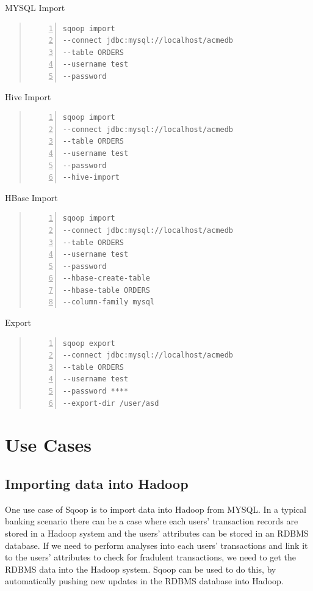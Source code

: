 \documentclass[9pt,twocolumn,twoside]{../../styles/osajnl}
\begin{document}
\begin{algorithm}
\caption{MYSQL Import}\label{alg:mysql}
\begin{quote}
\begin{Verbatim}[numbers=left]
sqoop import 
--connect jdbc:mysql://localhost/acmedb 
--table ORDERS 
--username test 
--password 
\end{Verbatim}
\end{quote}
\end{algorithm}
\begin{algorithm}
\caption{Hive Import}\label{alg:hive}
\begin{quote}
\begin{Verbatim}[numbers=left]
sqoop import 
--connect jdbc:mysql://localhost/acmedb 
--table ORDERS 
--username test 
--password
--hive-import
\end{Verbatim}
\end{quote}
\end{algorithm}
\begin{algorithm}
\caption{HBase Import}\label{alg:hbase}
\begin{quote}
\begin{Verbatim}[numbers=left]
sqoop import 
--connect jdbc:mysql://localhost/acmedb
--table ORDERS 
--username test 
--password 
--hbase-create-table 
--hbase-table ORDERS 
--column-family mysql
\end{Verbatim}
\end{quote}
\end{algorithm}

\begin{algorithm}
\caption{Export}\label{alg:export}
\begin{quote}
\begin{Verbatim}[numbers=left]
sqoop export
--connect jdbc:mysql://localhost/acmedb
--table ORDERS 
--username test 
--password **** 
--export-dir /user/asd
\end{Verbatim}
\end{quote}
\end{algorithm}

\section{Use Cases}
\subsection{Importing data into Hadoop}
One use case of Sqoop is to import data into Hadoop from MYSQL. In a typical banking scenario there can be a case where each users' transaction records are stored in a Hadoop system and the users' attributes can be stored in an RDBMS database. If we need to perform analyses into each users' transactions and link it to the users' attributes to check for fradulent transactions, we need to get the RDBMS data into the Hadoop system. Sqoop can be used to do this, by automatically pushing new updates in the RDBMS database into Hadoop. 
\end{document}
